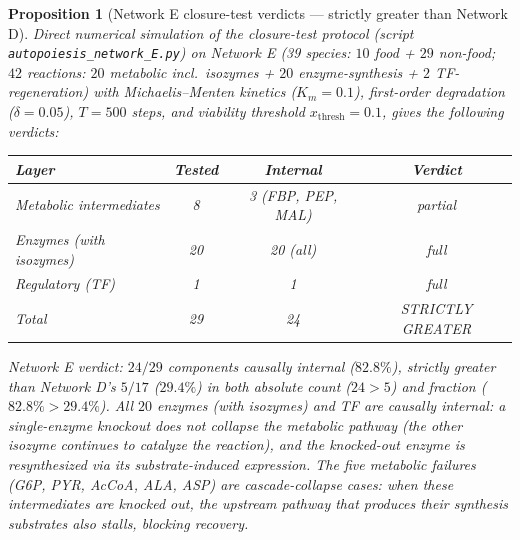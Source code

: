 \documentclass[11pt,a4paper]{article}
\theoremstyle{plain}
\newtheorem{proposition}[theorem]{Proposition}
\theoremstyle{definition}
\theoremstyle{remark}
\begin{document}
\begin{proposition}[Network E closure-test verdicts --- strictly
greater than Network D]
\label{prop:netE-verdict}
Direct numerical simulation of the closure-test protocol
(script \texttt{autopoiesis\_network\_E.py}) on Network E
(39 species: $10$ food + $29$ non-food; $42$ reactions: $20$ metabolic
incl.~isozymes + $20$ enzyme-synthesis + $2$ TF-regeneration) with
Michaelis--Menten kinetics ($K_m = 0.1$), first-order degradation
($\delta = 0.05$), $T = 500$ steps, and viability threshold
$x_{\mathrm{thresh}} = 0.1$, gives the following verdicts:
\begin{center}\small
\begin{tabular}{lccc}
\toprule
Layer & Tested & Internal & Verdict \\
\midrule
Metabolic intermediates & 8 & 3 (FBP, PEP, MAL) & partial \\
Enzymes (with isozymes) & 20 & 20 (all) & full \\
Regulatory (TF) & 1 & 1 & full \\
\midrule
Total & 29 & 24 & STRICTLY GREATER \\
\bottomrule
\end{tabular}
\end{center}
Network E verdict: $24/29$ components causally internal ($82.8\%$),
strictly greater than Network D's $5/17$ ($29.4\%$) in both absolute
count ($24 > 5$) and fraction ($82.8\% > 29.4\%$). All $20$ enzymes
(with isozymes) and TF are causally internal: a single-enzyme knockout
does not collapse the metabolic pathway (the other isozyme continues
to catalyze the reaction), and the knocked-out enzyme is resynthesized
via its substrate-induced expression. The five metabolic failures
(G6P, PYR, AcCoA, ALA, ASP) are cascade-collapse cases: when these
intermediates are knocked out, the upstream pathway that produces
their synthesis substrates also stalls, blocking recovery.
\end{proposition}
\end{document}
